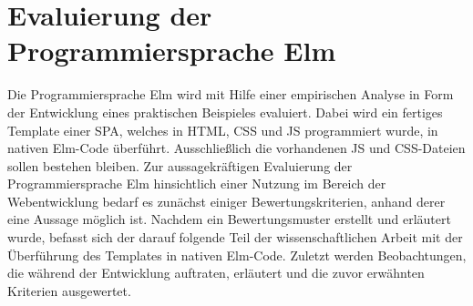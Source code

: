 \chapter{Evaluierung der Programmiersprache Elm}
\label{sec:Evaluierung der Programmiersprache Elm}
Die Programmiersprache Elm wird mit Hilfe einer empirischen Analyse in Form der Entwicklung eines praktischen Beispieles evaluiert. Dabei wird ein fertiges Template einer \ac{SPA}, welches in \ac{HTML}, \ac{CSS} und \ac{JS} programmiert wurde, in nativen Elm-Code überführt. Ausschließlich die vorhandenen \ac{JS} und \ac{CSS}-Dateien sollen bestehen bleiben. Zur aussagekräftigen Evaluierung der Programmiersprache Elm hinsichtlich einer Nutzung im Bereich der Webentwicklung bedarf es zunächst einiger Bewertungskriterien, anhand derer eine Aussage möglich ist. Nachdem ein Bewertungsmuster erstellt und erläutert wurde, befasst sich der darauf folgende Teil der wissenschaftlichen Arbeit mit der Überführung des Templates in nativen Elm-Code. Zuletzt werden Beobachtungen, die während der Entwicklung auftraten, erläutert und die zuvor erwähnten Kriterien ausgewertet.

